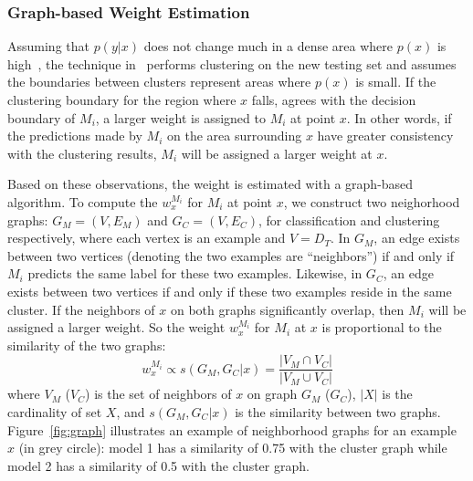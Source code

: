 \subsubsection{Graph-based Weight Estimation}\label{sec:gwe}
Assuming that $p(y|x)$ does not change much in a dense area where $p(x)$ is high~\cite{cluster},
the technique in~\cite{lwe} performs clustering on the new testing set and assumes the boundaries between clusters represent areas where $p(x)$ is small.
If the clustering boundary for the region where $x$ falls, agrees with the decision boundary of $M_i$,
a larger weight is assigned to $M_i$ at point $x$.
In other words, if the predictions made by $M_i$ on the area surrounding $x$ have greater consistency with the clustering results, $M_i$ will be assigned
a larger weight at $x$.

Based on these observations, the weight is estimated with a graph-based algorithm.
To compute the $w_{x}^{M_i}$ for $M_i$ at point $x$, we construct two neighorhood graphs:
$G_M = (V, E_M)$ and $G_C = (V, E_C)$, for classification and clustering respectively,
where each vertex is an example and $V = D_T$. In $G_M$, an edge exists between two vertices (denoting the two examples are ``neighbors'') if and only if $M_i$ predicts the same label for these two examples. Likewise, in $G_C$, an edge exists between two vertices if and only if these two examples reside in the same cluster.
If the neighbors of $x$ on both graphs significantly overlap, then $M_i$ will be assigned a larger weight.
So the weight $w_{x}^{M_i}$ for $M_i$ at $x$ is proportional to the similarity of the two graphs:
\begin{equation}\label{eq_sim}
w_{x}^{M_i} \propto s(G_M, G_C|x) = \frac {|V_M \cap V_C|} {|V_M \cup V_C|}
\end{equation}
where $V_M$ ($V_C$) is the set of neighbors of $x$ on graph $G_M$ ($G_C$), $|X|$ is the cardinality of set $X$, and $s(G_M, G_C|x)$ is the similarity between two graphs.
Figure~\ref{fig:graph} illustrates an example of neighborhood graphs for an example $x$ (in grey circle): model 1 has a similarity of 0.75 with the cluster graph
 while model 2 has a similarity of 0.5 with the cluster graph.

